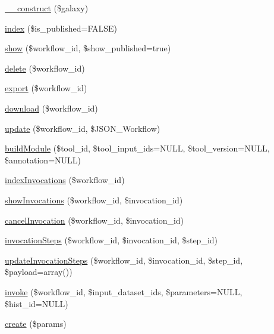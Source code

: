 \begin{DoxyCompactItemize}
\item 
\hyperlink{classWorkflows_acc3b406c5521cc768ad9aca9981f12f9}{\+\_\+\+\_\+construct} (\$galaxy)
\item 
\hyperlink{classWorkflows_ad111397f29f01809c4d803a7052075a7}{index} (\$is\+\_\+published=F\+A\+L\+SE)
\item 
\hyperlink{classWorkflows_abcd6e69e5f6fb77b5476c2303dda0a28}{show} (\$workflow\+\_\+id, \$show\+\_\+published=true)
\item 
\hyperlink{classWorkflows_a02d170de2fc5922195c37bcbd40c7fc3}{delete} (\$workflow\+\_\+id)
\item 
\hyperlink{classWorkflows_ab1d1388da67119d248dcb8cb38c48185}{export} (\$workflow\+\_\+id)
\item 
\hyperlink{classWorkflows_a4eb19053303e1c5e12ea7abd2de5718c}{download} (\$workflow\+\_\+id)
\item 
\hyperlink{classWorkflows_a2714dee5cc591b4bff8618ceccc9dbb2}{update} (\$workflow\+\_\+id, \$J\+S\+O\+N\+\_\+\+Workflow)
\item 
\hyperlink{classWorkflows_a6041804173008fa38f878265dde14405}{build\+Module} (\$tool\+\_\+id, \$tool\+\_\+input\+\_\+ids=N\+U\+LL, \$tool\+\_\+version=N\+U\+LL, \$annotation=N\+U\+LL)
\item 
\hyperlink{classWorkflows_a83c6891fd0b71d69917ad4dc0e2517d5}{index\+Invocations} (\$workflow\+\_\+id)
\item 
\hyperlink{classWorkflows_a3dfd3d41b78c18c112ebeab8bac7f6cf}{show\+Invocations} (\$workflow\+\_\+id, \$invocation\+\_\+id)
\item 
\hyperlink{classWorkflows_a51ecb7843d3ae01aaa080e56b3dd4be7}{cancel\+Invocation} (\$workflow\+\_\+id, \$invocation\+\_\+id)
\item 
\hyperlink{classWorkflows_a4a361f883c4e6f8d2dde77117de6e1c6}{invocation\+Steps} (\$workflow\+\_\+id, \$invocation\+\_\+id, \$step\+\_\+id)
\item 
\hyperlink{classWorkflows_a5dbf5a6dc6156664d6588b22599eebc5}{update\+Invocation\+Steps} (\$workflow\+\_\+id, \$invocation\+\_\+id, \$step\+\_\+id, \$payload=array())
\item 
\hyperlink{classWorkflows_a7e32dbe325c4d397e94da462fa71494f}{invoke} (\$workflow\+\_\+id, \$input\+\_\+dataset\+\_\+ids, \$parameters=N\+U\+LL, \$hist\+\_\+id=N\+U\+LL)
\item 
\hyperlink{classWorkflows_adec30fe8a3d234e40d257b5d917c079e}{create} (\$params)
\end{DoxyCompactItemize}
